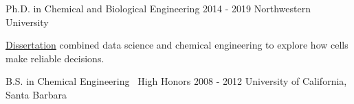 

\begin{cventries}

  \cventrynew
	{Ph.D. in Chemical and Biological Engineering} 	
	{2014 - 2019}
	{Northwestern University}
    { \begin{cvitems} 
      	\item {\href{https://github.com/sebastianbernasek/dissertation}{Dissertation} combined data science and chemical engineering to explore how cells make reliable decisions.}
      \end{cvitems}}
            	   
  \cventrynew
	{B.S. in Chemical Engineering \bullet\ High Honors} 	
	{2008 - 2012} 	
	{University of California, Santa Barbara}
	{}
    
\end{cventries}
